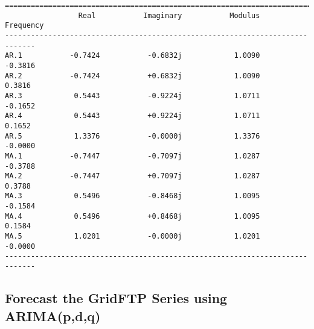 \documentclass[11pt]{article}
\begin{document}
\begin{Verbatim}[commandchars=\\\{\}]
=============================================================================
                 Real           Imaginary           Modulus         Frequency
-----------------------------------------------------------------------------
AR.1           -0.7424           -0.6832j            1.0090           -0.3816
AR.2           -0.7424           +0.6832j            1.0090            0.3816
AR.3            0.5443           -0.9224j            1.0711           -0.1652
AR.4            0.5443           +0.9224j            1.0711            0.1652
AR.5            1.3376           -0.0000j            1.3376           -0.0000
MA.1           -0.7447           -0.7097j            1.0287           -0.3788
MA.2           -0.7447           +0.7097j            1.0287            0.3788
MA.3            0.5496           -0.8468j            1.0095           -0.1584
MA.4            0.5496           +0.8468j            1.0095            0.1584
MA.5            1.0201           -0.0000j            1.0201           -0.0000
-----------------------------------------------------------------------------

    \end{Verbatim}

    \subsection{Forecast the GridFTP Series using
ARIMA(p,d,q)}\label{forecast-the-gridftp-series-using-arimapdq}
\end{document}
